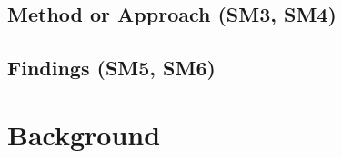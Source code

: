 \documentclass[
	a4paper,
	pagesize,
	pdftex,
	12pt,
	ngerman,
	fleqn,
	final,
	]{scrartcl}
\theoremstyle{plain}
\theoremstyle{definition}
\begin{document}
	\subsection{Method or Approach (SM3, SM4)}\label{sec:introduction::method}
	
	\subsection{Findings (SM5, SM6)}\label{sec:introduction::results}

\section{Background}
\end{document}
